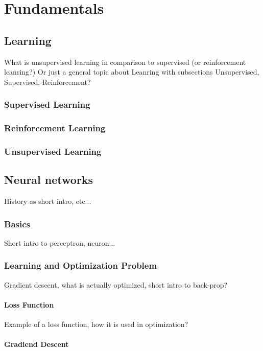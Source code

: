 \chapter{Fundamentals}

\section{Learning}

What is unsupervised learning in comparison to supervised (or reinforcement leanring?)
Or just a general topic about Leanring with subsections Unsupervised, Supervised, Reinforcement?

\subsection{Supervised Learning}
\subsection{Reinforcement Learning}
\subsection{Unsupervised Learning}


\section{Neural networks}

History as short intro, etc...

\subsection{Basics}

Short intro to perceptron, neuron...

\subsection{Learning and Optimization Problem}

Gradient descent, what is actually optimized, short intro to back-prop?

\subsubsection{Loss Function}

Example of a loss function, how it is used in optimization?

\subsubsection{Gradiend Descent}

